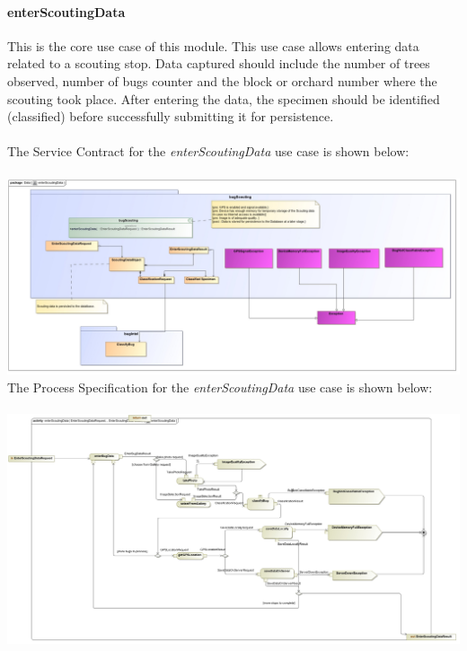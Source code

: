 \documentclass[11pt,a4paper,titlepage]{article}
\begin{document}
		\paragraph{enterScoutingData }
		This is the core use case of this module. This use case allows entering data related to a scouting stop. Data captured should include the number of trees observed, number of bugs counter and the block or orchard number where the scouting took place. After entering the data, the specimen should be identified (classified) before successfully submitting it for persistence.\\\hfill\\
		The Service Contract for the \textit{enterScoutingData} use case is shown below:\\\hfill\\
		\includegraphics[width=\linewidth]{enterScoutingData}
		The Process Specification for the \textit{enterScoutingData} use case is shown below:\\\hfill\\
		\includegraphics[width=\linewidth]{enterScoutingDataPS}
		
		
		
		
	
\end{document}

